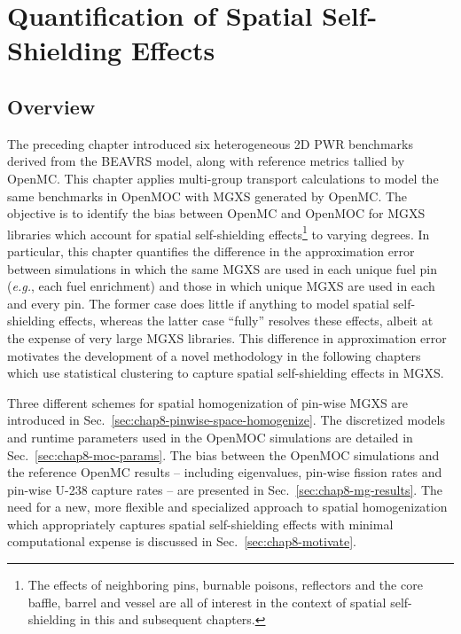 \chapter{Quantification of Spatial Self-Shielding Effects}
\label{chap:quantify}


\section{Overview}
\label{sec:chap8-overview}

The preceding chapter introduced six heterogeneous 2D \ac{PWR} benchmarks derived from the \ac{BEAVRS} model, along with reference metrics tallied by OpenMC. This chapter applies multi-group transport calculations to model the same benchmarks in OpenMOC with \ac{MGXS} generated by OpenMC. The objective is to identify the bias between OpenMC and OpenMOC for \ac{MGXS} libraries which account for spatial self-shielding effects\footnote{The effects of neighboring pins, burnable poisons, reflectors and the core baffle, barrel and vessel are all of interest in the context of spatial self-shielding in this and subsequent chapters.} to varying degrees. In particular, this chapter quantifies the difference in the approximation error between simulations in which the same \ac{MGXS} are used in each unique fuel pin (\textit{e.g.}, each fuel enrichment) and those in which unique \ac{MGXS} are used in each and every pin. The former case does little if anything to model spatial self-shielding effects, whereas the latter case ``fully'' resolves these effects, albeit at the expense of very large \ac{MGXS} libraries. This difference in approximation error motivates the development of a novel methodology in the following chapters which use statistical clustering to capture spatial self-shielding effects in \ac{MGXS}.

Three different schemes for spatial homogenization of pin-wise \ac{MGXS} are introduced in Sec.~\ref{sec:chap8-pinwise-space-homogenize}. The discretized models and runtime parameters used in the OpenMOC simulations are detailed in Sec.~\ref{sec:chap8-moc-params}. The bias between the OpenMOC simulations and the reference OpenMC results -- including eigenvalues, pin-wise fission rates and pin-wise U-238 capture rates -- are presented in Sec.~\ref{sec:chap8-mg-results}. The need for a new, more flexible and specialized approach to spatial homogenization which appropriately captures spatial self-shielding effects with minimal computational expense is discussed in Sec.~\ref{sec:chap8-motivate}.


